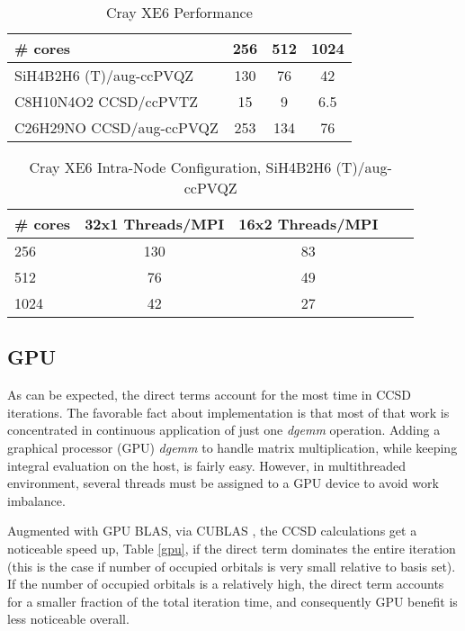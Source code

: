 \documentclass[12pt]{article} \usepackage[margin=1in]{geometry}
\begin{document}
\begin{table}
  \label{cray}
  \caption {Cray XE6 Performance}
  \begin{center}
    \begin{tabular}{| l | c | c | c |}
      \hline
      \# cores                     & 256 & 512 & 1024 \\ 
      \hline
      SiH4B2H6 (T)/aug-ccPVQZ   & 130 & 76  & 42   \\
      C8H10N4O2 CCSD/ccPVTZ     & 15  & 9   & 6.5  \\
      C26H29NO CCSD/aug-ccPVQZ  & 253 & 134 & 76   \\
      \hline
    \end{tabular}
  \end{center}
\end{table}


\begin{table}
  \label{cray}
  \caption {Cray XE6 Intra-Node Configuration, SiH4B2H6 (T)/aug-ccPVQZ}
  \begin{center}
    \begin{tabular}{| l | c | c | c | c |}
      \hline
      \# cores & 32x1 Threads/MPI & 16x2 Threads/MPI \\ 
      \hline
      256      & 130 & 83 \\
      512      & 76 & 49  \\
      1024     & 42 & 27  \\
      \hline
    \end{tabular}
  \end{center}
\end{table}

\subsection{GPU}
As can be expected, the direct terms account for the most time in CCSD
iterations.  The favorable fact about implementation is that most of
that work is concentrated in continuous application of just one
 {\it dgemm} operation.  Adding a graphical processor (GPU) {\it dgemm} to
handle matrix multiplication, while keeping integral evaluation on the
host, is fairly easy.  However, in multithreaded environment, several
threads must be assigned to a GPU device to avoid work imbalance.

Augmented with GPU BLAS, via CUBLAS \cite{nath2011accelerating}, the
CCSD calculations get a noticeable speed up, Table \ref{gpu}, if the
direct term dominates the entire iteration (this is the case if number
of occupied orbitals is very small relative to basis set).  If the
number of occupied orbitals is a relatively high, the direct term
accounts for a smaller fraction of the total iteration time, and
consequently GPU benefit is less noticeable overall.
\end{document}
